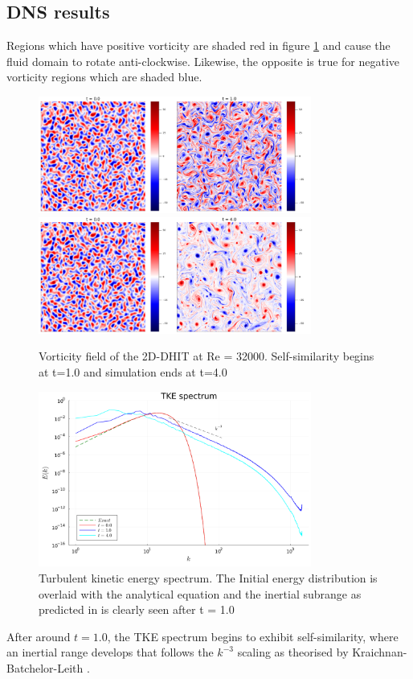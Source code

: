 \documentclass[conf]{new-aiaa}
\begin{document}
\subsection{DNS results}
Regions which have positive vorticity are shaded red in figure \ref{fig:DNS_field} and cause the fluid domain to rotate anti-clockwise. Likewise, the opposite is true for negative vorticity regions which are shaded blue.
\begin{figure}[htp]
    \centering
    \includegraphics[width=0.8\textwidth]{DNS_field_1.png}
    \includegraphics[width=0.8\textwidth]{DNS_field_4.png}
    \caption{Vorticity field of the 2D-DHIT at Re = 32000. Self-similarity begins at t=1.0 and simulation ends at t=4.0}
    \label{fig:DNS_field}
\end{figure}
\begin{figure}[htp]
    \centering
    \includegraphics[width=0.8\textwidth]{TKE_1.png}
    \caption{Turbulent kinetic energy spectrum. The Initial energy distribution is overlaid with the analytical equation and the inertial subrange as predicted in \cite{Kraichnan,batchelor1969computation,leith1971atmospheric} is clearly seen after t = 1.0}
    \label{fig:TKE_1}
\end{figure}
After around $t=1.0$, the TKE spectrum begins to exhibit self-similarity, where an inertial range develops that follows the $k^{-3}$ scaling as theorised by Kraichnan-Batchelor-Leith \cite{Kraichnan,batchelor1969computation,leith1971atmospheric}.
\pagebreak
\end{document}
